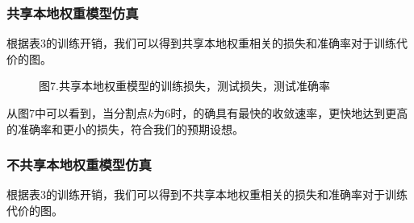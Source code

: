 \documentclass{article}
\begin{document}
\subsubsection{共享本地权重模型仿真}
根据表3的训练开销，我们可以得到共享本地权重相关的损失和准确率对于训练代价的图。
\begin{figure}[H]
    \centering
    \caption*{图7.共享本地权重模型的训练损失，测试损失，测试准确率}
\end{figure}

从图7中可以看到，当分割点$k$为6时，的确具有最快的收敛速率，更快地达到更高的准确率和更小的损失，符合我们的预期设想。


\subsubsection{不共享本地权重模型仿真}
根据表3的训练开销，我们可以得到不共享本地权重相关的损失和准确率对于训练代价的图。
\end{document}
